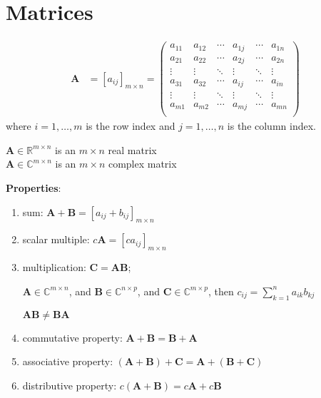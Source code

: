 \documentclass[12pt]{article}
\newcommand{\ve}[1]{\ensuremath{\mathbf{#1}}}
\begin{document}
\section{Matrices}

\begin{align}
    \ve{A} &= [a_{ij}]_{m\times n}   =    \begin{pmatrix}
      a_{11} & a_{12} & \cdots & a_{1j} & \cdots & a_{1n} \\
      a_{21} & a_{22} & \cdots & a_{2j} & \cdots & a_{2n} \\
       \vdots & \vdots & \ddots & \vdots & \ddots   & \vdots \\     
      a_{31} & a_{32} & \cdots & a_{ij} & \cdots & a_{in} \\
      \vdots & \vdots & \ddots & \vdots & \ddots   & \vdots \\
      a_{m1} & a_{m2} & \cdots & a_{mj} & \cdots & a_{mn} \\
    \end{pmatrix} \nonumber   
\end{align} 
%
where $i = 1, \dots, m$ is the row index and $j = 1, \dots, n$ is the column index.

$\ve{A} \in \mathbb{R}^{m \times n}$ is an $m \times n$ real matrix\\
$\ve{A} \in \mathbb{C}^{m \times n}$ is an $m \times n$ complex matrix

\textbf{Properties}:
%
\begin{enumerate}
\item sum: $\ve{A} + \ve{B} = [a_{ij} + b_{ij}]_{m \times n}$

\item scalar multiple: $c\ve{A} = [c a_{ij}]_{m \times n}$

\item multiplication: $\ve{C} = \ve{A}\ve{B}$;

$\ve{A} \in \mathbb{C}^{m \times n}$, and $\ve{B} \in \mathbb{C}^{n \times p}$, and $\ve{C} \in \mathbb{C}^{m \times p}$, then $c_{ij} = \sum_{k=1}^n a_{ik} b_{kj}$

$\ve{A}\ve{B} \neq \ve{B}\ve{A}$

\item commutative property: $\ve{A} + \ve{B} = \ve{B} + \ve{A}$

\item associative property: $(\ve{A} + \ve{B}) + \ve{C} = \ve{A} + (\ve{B} + \ve{C})$

\item distributive property: $c(\ve{A} + \ve{B}) = c\ve{A} + c\ve{B}$

\end{enumerate}
\end{document}
